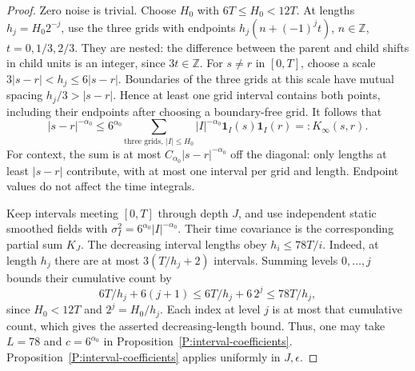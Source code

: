 \documentclass[12pt]{article}
\numberwithin{equation}{section}
\theoremstyle{definition}
\begin{document}
\begin{proof}
  Zero noise is trivial. Choose $H_0$ with $6T\le H_0<12T$.
  At lengths $h_j=H_0 2^{-j}$, use the three grids with endpoints
  $h_j(n+(-1)^j t)$, $n\in\mathbb Z$, $t=0,1/3,2/3$.
  They are nested: the difference between the parent and child shifts
  in child units is an integer, since $3t\in\mathbb Z$.
  For $s\ne r$ in $[0,T]$, choose a scale
  $3|s-r|<h_j\le6|s-r|$.
  Boundaries of the three grids at this scale have mutual spacing
  $h_j/3>|s-r|$. Hence at least one grid interval contains both points,
  including their endpoints after choosing a boundary-free grid.
  It follows that
  \begin{equation}\label{E:dyadic-time-majorant}
    |s-r|^{-\alpha_0}
    \le6^{\alpha_0}\sum_{\text{three grids},\,|I|\le H_0}
    |I|^{-\alpha_0}\mathbf1_I(s)\mathbf1_I(r)=:K_\infty(s,r).
  \end{equation}
  For context, the sum is at most $C_{\alpha_0}|s-r|^{-\alpha_0}$ off the diagonal:
  only lengths at least $|s-r|$ contribute, with at most one interval
  per grid and length. Endpoint values do not affect the time integrals.

  Keep intervals meeting $[0,T]$ through depth $J$, and use independent
  static smoothed fields with $\sigma_I^2=6^{\alpha_0}|I|^{-\alpha_0}$.
  Their time covariance is the corresponding partial sum $K_J$.
  The decreasing interval lengths obey $h_i\le78T/i$.
  Indeed, at length $h_j$ there are at most $3(T/h_j+2)$ intervals.
  Summing levels $0,\ldots,j$ bounds their cumulative count by
  \[
    6T/h_j+6(j+1)\le6T/h_j+6\,2^j\le78T/h_j,
  \]
  since $H_0<12T$ and $2^j=H_0/h_j$.
  Each index at level $j$ is at most that cumulative count, which gives
  the asserted decreasing-length bound. Thus, one may take $L=78$
  and $c=6^{\alpha_0}$ in Proposition~\ref{P:interval-coefficients}.
  Proposition~\ref{P:interval-coefficients} applies uniformly in $J,\epsilon$.


\end{proof}
\end{document}
